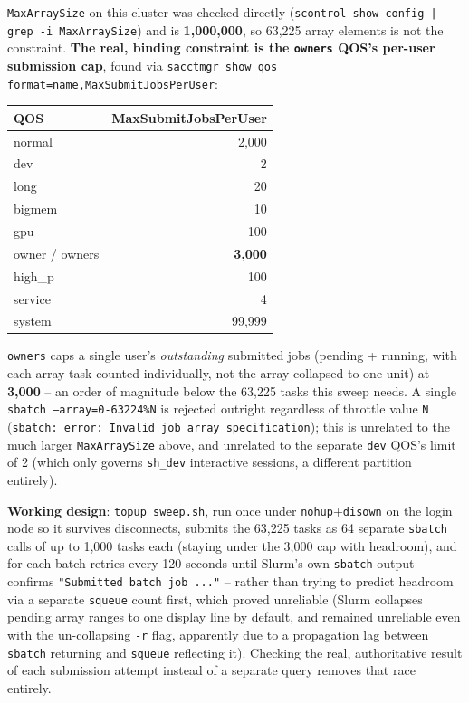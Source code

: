 \documentclass[11pt]{article}
\begin{document}
\texttt{MaxArraySize} on this cluster was checked directly (\texttt{scontrol show config | grep
-i MaxArraySize}) and is \textbf{1{,}000{,}000}, so 63,225 array elements is not the constraint.
\textbf{The real, binding constraint is the \texttt{owners} QOS's per-user submission cap},
found via \texttt{sacctmgr show qos format=name,MaxSubmitJobsPerUser}:

\begin{table}[h]
\centering
\small
\begin{tabular}{@{}lr@{}}
\toprule
\textbf{QOS} & \textbf{MaxSubmitJobsPerUser} \\
\midrule
normal & 2{,}000 \\
dev & 2 \\
long & 20 \\
bigmem & 10 \\
gpu & 100 \\
owner / owners & \textbf{3{,}000} \\
high\_p & 100 \\
service & 4 \\
system & 99{,}999 \\
\bottomrule
\end{tabular}
\end{table}

\texttt{owners} caps a single user's \emph{outstanding} submitted jobs (pending + running, with
each array task counted individually, not the array collapsed to one unit) at
\textbf{3{,}000} -- an order of magnitude below the 63,225 tasks this sweep needs. A single
\texttt{sbatch --array=0-63224\%N} is rejected outright regardless of throttle value \texttt{N}
(\texttt{sbatch: error: Invalid job array specification}); this is unrelated to the much larger
\texttt{MaxArraySize} above, and unrelated to the separate \texttt{dev} QOS's limit of 2 (which
only governs \texttt{sh\_dev} interactive sessions, a different partition entirely).

\textbf{Working design}: \texttt{topup\_sweep.sh}, run once under \texttt{nohup}+\texttt{disown}
on the login node so it survives disconnects, submits the 63,225 tasks as 64 separate
\texttt{sbatch} calls of up to 1,000 tasks each (staying under the 3,000 cap with headroom), and
for each batch retries every 120 seconds until Slurm's own \texttt{sbatch} output confirms
\texttt{"Submitted batch job ..."} -- rather than trying to predict headroom via a separate
\texttt{squeue} count first, which proved unreliable (Slurm collapses pending array ranges to one
display line by default, and remained unreliable even with the un-collapsing \texttt{-r} flag,
apparently due to a propagation lag between \texttt{sbatch} returning and \texttt{squeue}
reflecting it). Checking the real, authoritative result of each submission attempt instead of a
separate query removes that race entirely.
\end{document}

